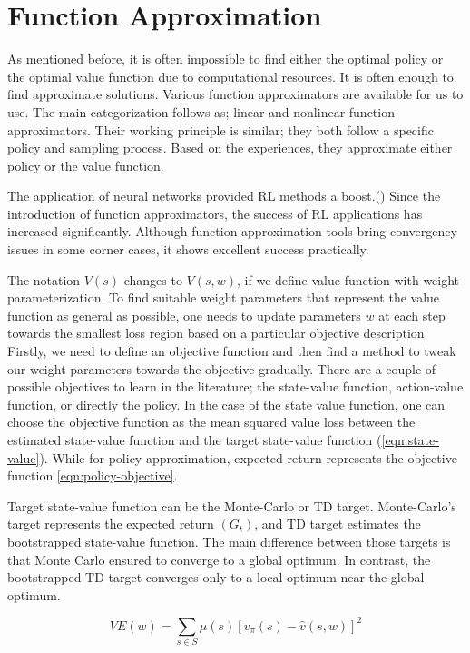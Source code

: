 \section{Function Approximation}
As mentioned before, it is often impossible to find either the optimal policy or the optimal value function due to computational resources. It is often enough to find approximate solutions. Various function approximators are available for us to use. The main categorization follows as; linear and nonlinear function approximators. Their working principle is similar; they both follow a specific policy and sampling process. Based on the experiences, they approximate either policy or the value function. 

The application of neural networks provided RL methods a boost.() Since the introduction of function approximators, the success of RL applications has increased significantly. Although function approximation tools bring convergency issues in some corner cases, it shows excellent success practically. 

The notation \(V(s)\) changes to \(V(s, w)\), if we define value function with weight parameterization. To find suitable weight parameters that represent the value function as general as possible, one needs to update parameters \(w\) at each step towards the smallest loss region based on a particular objective description. Firstly, we need to define an objective function and then find a method to tweak our weight parameters towards the objective gradually. 
There are a couple of possible objectives to learn in the literature; the state-value function, action-value function, or directly the policy.
In the case of the state value function, one can choose the objective function as the mean squared value loss between the estimated state-value function and the target state-value function (\ref{eqn:state-value}). While for policy approximation, expected return represents the objective function \ref{eqn:policy-objective}. 

Target state-value function can be the Monte-Carlo or TD target. Monte-Carlo’s target represents the expected return \((G_t)\), and TD target estimates the bootstrapped state-value function. The main difference between those targets is that Monte Carlo ensured to converge to a global optimum. In contrast, the bootstrapped TD target converges only to a local optimum near the global optimum. 

\begin{equation}
    \label{eqn:state-value}
    VE(w) = \sum\limits_{s\in S} \mu(s)[v_\pi(s) - \hat{v}(s,w)]^2
\end{equation}


